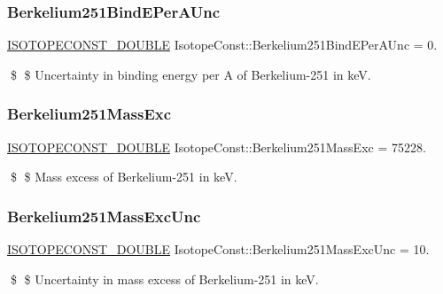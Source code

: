 \subsubsection{\texorpdfstring{Berkelium251\+Bind\+E\+Per\+A\+Unc}{Berkelium251BindEPerAUnc}}
{\footnotesize\ttfamily \mbox{\hyperlink{group___isotope_const-_macros_ga8f45a7272ce02c0b4c65c44636ed719a}{I\+S\+O\+T\+O\+P\+E\+C\+O\+N\+S\+T\+\_\+\+D\+O\+U\+B\+LE}} Isotope\+Const\+::\+Berkelium251\+Bind\+E\+Per\+A\+Unc = 0.}

\$ \$ Uncertainty in binding energy per A of Berkelium-\/251 in keV. \mbox{\label{group___isotope_const-_berkelium-_bk251_gae546583a6206e415d22803506316f57e}} 
\subsubsection{\texorpdfstring{Berkelium251\+Mass\+Exc}{Berkelium251MassExc}}
{\footnotesize\ttfamily \mbox{\hyperlink{group___isotope_const-_macros_ga8f45a7272ce02c0b4c65c44636ed719a}{I\+S\+O\+T\+O\+P\+E\+C\+O\+N\+S\+T\+\_\+\+D\+O\+U\+B\+LE}} Isotope\+Const\+::\+Berkelium251\+Mass\+Exc = 75228.}

\$ \$ Mass excess of Berkelium-\/251 in keV. \mbox{\label{group___isotope_const-_berkelium-_bk251_gaee9fbffe39e581f9d1f0df975945d053}} 
\subsubsection{\texorpdfstring{Berkelium251\+Mass\+Exc\+Unc}{Berkelium251MassExcUnc}}
{\footnotesize\ttfamily \mbox{\hyperlink{group___isotope_const-_macros_ga8f45a7272ce02c0b4c65c44636ed719a}{I\+S\+O\+T\+O\+P\+E\+C\+O\+N\+S\+T\+\_\+\+D\+O\+U\+B\+LE}} Isotope\+Const\+::\+Berkelium251\+Mass\+Exc\+Unc = 10.}

\$ \$ Uncertainty in mass excess of Berkelium-\/251 in keV. \mbox{\label{group___isotope_const-_berkelium-_bk251_gaac2ac28f33f1bef5a41b62dfabe1fc27}} 
